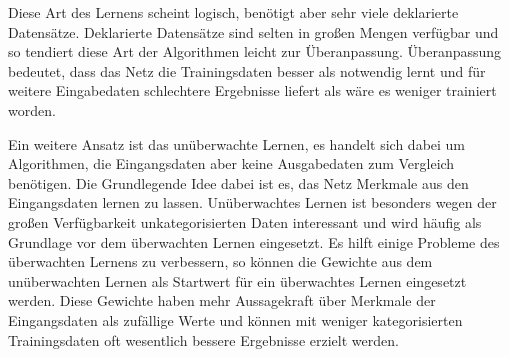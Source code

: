 Diese Art des Lernens scheint logisch, benötigt aber sehr viele deklarierte Datensätze. Deklarierte Datensätze sind selten in großen Mengen verfügbar und so tendiert diese Art der Algorithmen leicht zur Überanpassung. Überanpassung bedeutet, dass das Netz die Trainingsdaten besser als notwendig lernt und für weitere Eingabedaten schlechtere Ergebnisse liefert als wäre es weniger trainiert worden.

Ein weitere Ansatz ist das unüberwachte Lernen, es handelt sich dabei um Algorithmen, die Eingangsdaten aber keine Ausgabedaten zum Vergleich benötigen. Die Grundlegende Idee dabei ist es, das Netz Merkmale aus den Eingangsdaten lernen zu lassen. Unüberwachtes Lernen ist besonders wegen der großen Verfügbarkeit unkategorisierten Daten interessant und wird häufig als Grundlage vor dem überwachten Lernen eingesetzt. Es hilft einige Probleme des überwachten Lernens zu verbessern, so können die Gewichte aus dem unüberwachten Lernen als Startwert für ein überwachtes Lernen eingesetzt werden. Diese Gewichte haben mehr Aussagekraft über Merkmale der Eingangsdaten als zufällige Werte und können mit weniger kategorisierten Trainingsdaten oft wesentlich bessere Ergebnisse erzielt werden.